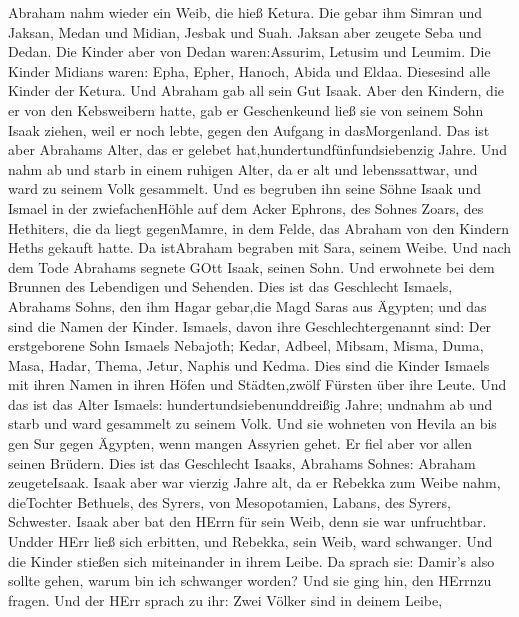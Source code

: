  Abraham nahm wieder ein Weib, die hieß Ketura. 
Die gebar ihm Simran und Jaksan, Medan und Midian, Jesbak und Suah.
 Jaksan aber zeugete Seba und Dedan. Die Kinder aber von
Dedan waren:Assurim, Letusim und Leumim.  Die Kinder Midians
waren: Epha, Epher, Hanoch, Abida und Eldaa. Diesesind alle Kinder der
Ketura.  Und Abraham gab all sein Gut Isaak. 
Aber den Kindern, die er von den Kebsweibern hatte, gab er Geschenkeund
ließ sie von seinem Sohn Isaak ziehen, weil er noch lebte, gegen den
Aufgang in dasMorgenland.  Das ist aber Abrahams Alter, das
er gelebet hat,hundertundfünfundsiebenzig Jahre.  Und nahm
ab und starb in einem ruhigen Alter, da er alt und lebenssattwar, und
ward zu seinem Volk gesammelt.  Und es begruben ihn seine
Söhne Isaak und Ismael in der zwiefachenHöhle auf dem Acker Ephrons, des
Sohnes Zoars, des Hethiters, die da liegt gegenMamre,  in
dem Felde, das Abraham von den Kindern Heths gekauft hatte. Da
istAbraham begraben mit Sara, seinem Weibe.  Und nach dem
Tode Abrahams segnete GOtt Isaak, seinen Sohn. Und erwohnete bei dem
Brunnen des Lebendigen und Sehenden.  Dies ist das
Geschlecht Ismaels, Abrahams Sohns, den ihm Hagar gebar,die Magd Saras
aus Ägypten;  und das sind die Namen der Kinder. Ismaels,
davon ihre Geschlechtergenannt sind: Der erstgeborene Sohn Ismaels
Nebajoth; Kedar, Adbeel, Mibsam,  Misma, Duma, Masa,
 Hadar, Thema, Jetur, Naphis und Kedma.  Dies
sind die Kinder Ismaels mit ihren Namen in ihren Höfen und Städten,zwölf
Fürsten über ihre Leute.  Und das ist das Alter Ismaels:
hundertundsiebenunddreißig Jahre; undnahm ab und starb und ward
gesammelt zu seinem Volk.  Und sie wohneten von Hevila an
bis gen Sur gegen Ägypten, wenn mangen Assyrien gehet. Er fiel aber vor
allen seinen Brüdern.  Dies ist das Geschlecht Isaaks,
Abrahams Sohnes: Abraham zeugeteIsaak.  Isaak aber war
vierzig Jahre alt, da er Rebekka zum Weibe nahm, dieTochter Bethuels,
des Syrers, von Mesopotamien, Labans, des Syrers, Schwester.
 Isaak aber bat den HErrn für sein Weib, denn sie war
unfruchtbar. Undder HErr ließ sich erbitten, und Rebekka, sein Weib,
ward schwanger.  Und die Kinder stießen sich miteinander in
ihrem Leibe. Da sprach sie: Damir's also sollte gehen, warum bin ich
schwanger worden? Und sie ging hin, den HErrnzu fragen. 
Und der HErr sprach zu ihr: Zwei Völker sind in deinem Leibe,

